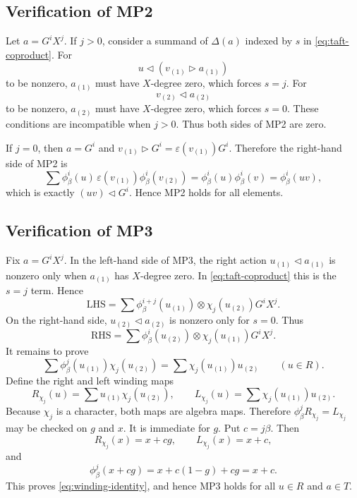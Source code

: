 \documentclass[twoside,11pt]{amsart}
\begin{document}
	\subsection{Verification of MP2}
	
	Let $a=G^iX^j$. If $j>0$, consider a summand of
	$\Delta(a)$ indexed by $s$ in \eqref{eq:taft-coproduct}. For
	\[
	u\triangleleft(v_{(1)}\triangleright a_{(1)})
	\]
	to be nonzero, $a_{(1)}$ must have $X$-degree zero, which forces $s=j$.
	For
	\[
	v_{(2)}\triangleleft a_{(2)}
	\]
	to be nonzero, $a_{(2)}$ must have $X$-degree zero, which forces $s=0$.
	These conditions are incompatible when $j>0$. Thus both sides of MP2 are
	zero.
	
	If $j=0$, then $a=G^i$ and
	$v_{(1)}\triangleright G^i=\varepsilon(v_{(1)})G^i$. Therefore the
	right-hand side of MP2 is
	\[
	\sum
	\phi_\beta^i(u)\,
	\varepsilon(v_{(1)})\phi_\beta^i(v_{(2)})
	=\phi_\beta^i(u)\phi_\beta^i(v)
	=\phi_\beta^i(uv),
	\]
	which is exactly $(uv)\triangleleft G^i$. Hence MP2 holds for all elements.
	
	\subsection{Verification of MP3}
	
	Fix $a=G^iX^j$. In the left-hand side of MP3, the right action
	$u_{(1)}\triangleleft a_{(1)}$ is nonzero only when $a_{(1)}$ has
	$X$-degree zero. In \eqref{eq:taft-coproduct} this is the $s=j$ term. Hence
	\[
	\mathrm{LHS}
	=\sum
	\phi_\beta^{i+j}(u_{(1)})
	\otimes\chi_j(u_{(2)})G^iX^j.
	\]
	On the right-hand side, $u_{(2)}\triangleleft a_{(2)}$ is nonzero only for
	$s=0$. Thus
	\[
	\mathrm{RHS}
	=\sum
	\phi_\beta^i(u_{(2)})
	\otimes\chi_j(u_{(1)})G^iX^j.
	\]
	It remains to prove
	\begin{equation}\label{eq:winding-identity}
		\sum\phi_\beta^j(u_{(1)})\chi_j(u_{(2)})
		=\sum\chi_j(u_{(1)})u_{(2)}
		\qquad(u\in R).
	\end{equation}
	Define the right and left winding maps
	\[
	R_{\chi_j}(u)=\sum u_{(1)}\chi_j(u_{(2)}),
	\qquad
	L_{\chi_j}(u)=\sum\chi_j(u_{(1)})u_{(2)}.
	\]
	Because $\chi_j$ is a character, both maps are algebra maps. Therefore
	$\phi_\beta^jR_{\chi_j}=L_{\chi_j}$ may be checked on $g$ and $x$. It is
	immediate for $g$. Put $c=j\beta$. Then
	\[
	R_{\chi_j}(x)=x+cg,
	\qquad
	L_{\chi_j}(x)=x+c,
	\]
	and
	\[
	\phi_\beta^j(x+cg)
	=x+c(1-g)+cg=x+c.
	\]
	This proves \eqref{eq:winding-identity}, and hence MP3 holds for all
	$u\in R$ and $a\in T$.
	
\end{document}
